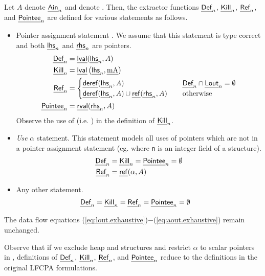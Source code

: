 \documentclass[a4paper,11pt,fleqn]{article}
\newcommand{\pointer}{\text{\sf\em P\/}\xspace}
\newcommand{\ain}{\text{{\sf\em Ain\/}}\xspace}
\newcommand{\lout}{\text{{\sf\em Lout\/}}\xspace}
\newcommand{\must}{\text{\sf\em Must\/}\xspace}
\newcommand{\Def}{\text{{\sf\em Def}}\xspace}
\newcommand{\Pointee}{\text{{\sf\em Pointee}}\xspace}
\newcommand{\Kill}{\text{{\sf\em Kill}}\xspace}
\newcommand{\Ref}{\text{{\sf\em Ref}}\xspace}
\begin{document}
Let $A$ denote $\ain_n$ and \ma denote \text{$\must(A)$} . Then,
the extractor functions $\Def_n$, $\Kill_n$, $\Ref_n$, and $\Pointee_n$ are defined for various statements
as follows. 
\begin{itemize}
\item Pointer assignment statement . We assume that this statement is type correct and both 
$\text{\sf\em lhs\/}_n$ and $\text{\sf\em rhs\/}_n$ are pointers.
\begin{align}
\Def_n & = \lval(\lhs_n,A) 
		\label{eq:def.heap} 
	\\
\Kill_n & =  
	\lval\left(\lhs_n, \ma\right)
		\label{eq:kill.heap}
\\
\Ref_n & = 
		\begin{cases}
		\derefp(\lhs_n,A)   
			& \Def_n \cap \lout_n = \emptyset
			\\
\derefp(\lhs_n,A) \cup \refp(\rhs_n,A)   \hspace*{4mm}
			& \text{otherwise}
		\end{cases}
	\\
\Pointee_n & =  
	\rval(\rhs_n, A)
\end{align}
Observe the use of  \ma (i.e. \text{$\must(A)$}) in the definition of $\Kill_n$.


\item {\em Use\/} $\alpha$ statement. This statement models all uses of pointers which are 
      not in a pointer assignment statement (eg.  where {\tt n} is an integer field of a structure).
	\begin{align}
	\Def_n & = \Kill_n = \Pointee_n = \emptyset
		\\
	\Ref_n & = \refp(\alpha,A)
		\label{eq:ref.use.heap}
	\end{align}
\item Any other statement.
\begin{align}
	\Def_n  & = \Kill_n = \Ref_n = \Pointee_n = \emptyset
		\label{eq:anu.other.heap}
\end{align}
\end{itemize}

The data flow equations (\ref{eq:lout.exhaustive})$-$(\ref{eq:aout.exhaustive}) remain unchanged.

Observe that if we exclude heap and structures and restrict $\alpha$ to scalar pointers in \pointer, 
definitions \text{(\ref{eq:def.heap})$-$(\ref{eq:anu.other.heap})} of
$\Def_n$, $\Kill_n$, $\Ref_n$, and $\Pointee_n$ reduce to the definitions in the original LFCPA formulations.
\end{document}
